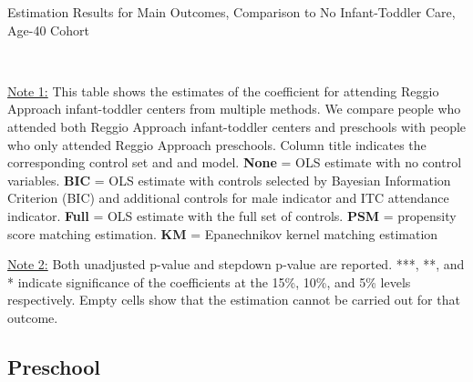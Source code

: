 \begin{table}[H] \caption{Estimation Results for Main Outcomes, Comparison to No Infant-Toddler Care, Age-40 Cohort} \label{ols-M-adult40-reg-nopres-asilo}
\scalebox{0.68}{}
\vspace{1ex} \\
\footnotesize\raggedright{\underline{Note 1:} This table shows the estimates of the coefficient for attending Reggio Approach infant-toddler centers from multiple methods. We compare people who attended both Reggio Approach infant-toddler centers and preschools with people who only attended Reggio Approach preschools. Column title indicates the corresponding control set and and model.  \textbf{None} = OLS estimate with no control variables. \textbf{BIC} = OLS estimate with controls selected by Bayesian Information Criterion (BIC) and additional controls for male indicator and ITC attendance indicator. \textbf{Full} = OLS estimate with the full set of controls. \textbf{PSM} =  propensity score matching estimation. \textbf{KM} =  Epanechnikov kernel matching estimation}

\footnotesize\raggedright{\underline{Note 2:} Both unadjusted p-value and stepdown p-value are reported. ***, **, and * indicate significance of the coefficients at the 15\%, 10\%, and 5\% levels respectively. Empty cells show that the estimation cannot be carried out for that outcome.}
\end{table}

\subsection{Preschool}

